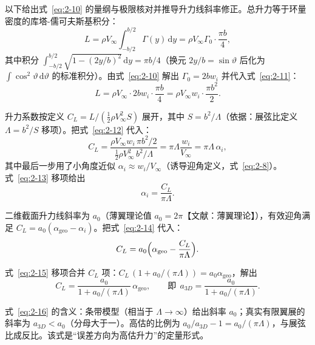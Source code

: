\documentclass[11pt,a4paper]{ctexart}
\numberwithin{equation}{section}
\begin{document}
以下给出式~\eqref{eq:2-10} 的量纲与极限核对并推导升力线斜率修正。总升力等于环量密度的库塔-儒可夫斯基积分：
\begin{equation}
  L = \rho V_\infty \int_{-b/2}^{b/2} \Gamma(y)\,\mathrm{d}y = \rho V_\infty \Gamma_0 \cdot \frac{\pi b}{4}, \label{eq:2-11}
\end{equation}
其中积分 $\int_{-b/2}^{b/2} \sqrt{1 - (2y/b)^2}\,\mathrm{d}y = \pi b/4$（换元 $2y/b = \sin\vartheta$ 后化为 $\int\cos^2\vartheta\,\mathrm{d}\vartheta$ 的标准积分）。由式~\eqref{eq:2-10} 解出 $\Gamma_0 = 2bw_i$ 并代入式~\eqref{eq:2-11}：
\begin{equation}
  L = \rho V_\infty \cdot 2bw_i \cdot \frac{\pi b}{4} = \rho V_\infty w_i \cdot \frac{\pi b^2}{2}. \label{eq:2-12}
\end{equation}

升力系数按定义 $C_L = L/( \tfrac{1}{2}\rho V_\infty^2 S )$ 展开，其中 $S = b^2/\Lambda$（依据：展弦比定义 $\Lambda = b^2/S$ 移项）。把式~\eqref{eq:2-12} 代入：
\begin{equation}
  C_L = \frac{\rho V_\infty w_i \,\pi b^2/2}{\tfrac{1}{2}\rho V_\infty^2\, b^2/\Lambda}
  = \pi\Lambda\frac{w_i}{V_\infty} = \pi\Lambda\,\alpha_i, \label{eq:2-13}
\end{equation}
其中最后一步用了小角度近似 $\alpha_i \approx w_i/V_\infty$（诱导迎角定义，式~\eqref{eq:2-8}）。式~\eqref{eq:2-13} 移项给出
\begin{equation}
  \alpha_i = \frac{C_L}{\pi\Lambda}. \label{eq:2-14}
\end{equation}

二维截面升力线斜率为 $a_0$（薄翼理论值 $a_0 = 2\pi$【文献：薄翼理论】），有效迎角满足 $C_L = a_0(\alpha_{\text{geo}} - \alpha_i)$。把式~\eqref{eq:2-14} 代入：
\begin{equation}
  C_L = a_0\Bigl(\alpha_{\text{geo}} - \frac{C_L}{\pi\Lambda}\Bigr). \label{eq:2-15}
\end{equation}

式~\eqref{eq:2-15} 移项合并 $C_L$ 项：$C_L\,(1 + a_0/(\pi\Lambda)) = a_0\alpha_{\text{geo}}$，解出
\begin{equation}
  C_L = \frac{a_0}{1 + a_0/(\pi\Lambda)}\,\alpha_{\text{geo}}, \qquad \text{即}\ \ a_{3D} = \frac{a_0}{1 + a_0/(\pi\Lambda)}. \label{eq:2-16}
\end{equation}

式~\eqref{eq:2-16} 的含义：条带模型（相当于 $\Lambda \to \infty$）给出斜率 $a_0$；真实有限翼展的斜率为 $a_{3D} < a_0$（分母大于一）。高估的比例为 $a_0/a_{3D} - 1 = a_0/(\pi\Lambda)$，与展弦比成反比。该式是“误差方向为高估升力”的定量形式。
\end{document}
